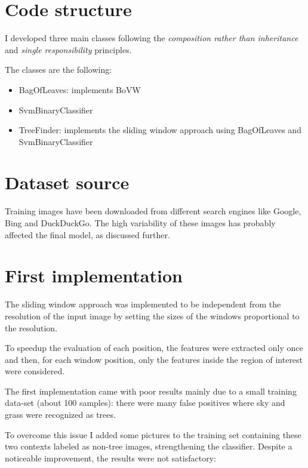 \documentclass[]{report}
\begin{document}
\section{Code structure}
I developed three main classes following the \textit{composition rather than inheritance} and \textit{single responsibility} principles.

The classes are the following:

\begin{itemize}
	\item  BagOfLeaves: implements BoVW
	\item SvmBinaryClassifier
	\item TreeFinder: implements the sliding window approach using BagOfLeaves and SvmBinaryClassifier
\end{itemize}

\section{Dataset source}
Training images have been downloaded from different search engines like Google, Bing and DuckDuckGo.
The high variability of these images has probably affected the final model, as discussed further.

\newpage
\section{First implementation}
The sliding window approach was implemented to be independent from the resolution of the input image by setting the sizes of the windows proportional to the resolution.

To speedup the evaluation of each position, the features were extracted only once and then, for each window position, only the features inside the region of interest were considered.

The first implementation came with poor results mainly due to a small training data-set (about 100 samples): there were many false positives where sky and grass were recognized as trees. 

To overcome this issue I added some pictures to the training set containing these two contexts labeled as non-tree images, strengthening the classifier. 
Despite a noticeable  improvement, the results were not satisfactory:

\vspace{0.5cm}
\end{document}
